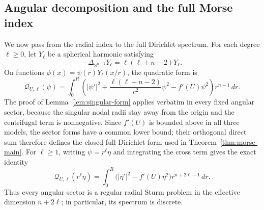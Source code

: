 \documentclass[11pt]{article}
\begin{document}
\subsection{Angular decomposition and the full Morse index}


{We now pass from the radial index to the full Dirichlet spectrum.
For each degree $\ell\ge0$, let $Y_\ell$ be a spherical harmonic satisfying}
\[
 -\Delta_{\mathbb S^{n-1}}Y_\ell
 =\ell(\ell+n-2)Y_\ell.
\]
On functions $\phi(x)=\psi(r)Y_\ell(x/r)$, the quadratic form is
\begin{equation}\label{eq:angular-form}
 \mathcal Q_{U,\ell}(\psi)
 =\int_0^R\left(
 |\psi'|^2+\frac{\ell(\ell+n-2)}{r^2}\psi^2
 -f'(U)\psi^2\right)r^{n-1}\,dr.
\end{equation}
{The proof of Lemma~\ref{lem:singular-form} applies verbatim in every
fixed angular sector, because the singular nodal radii stay away from the
origin and the centrifugal term is nonnegative.  Since $f'(U)$ is bounded
above in all three models, the sector forms have a common lower bound; their
orthogonal direct sum therefore defines the closed full Dirichlet form used
in Theorem~\ref{thm:morse-main}.}
For
$\ell\ge1$, writing $\psi=r^\ell\eta$ and integrating the cross term gives
the exact identity
\begin{equation*}
 \mathcal Q_{U,\ell}(r^\ell\eta)
 =\int_0^R\bigl(|\eta'|^2-f'(U)\eta^2\bigr)
 r^{n+2\ell-1}\,dr.
\end{equation*}
Thus every angular sector is a regular radial Sturm problem in the effective
dimension $n+2\ell$; in particular, its spectrum is discrete.
\end{document}
